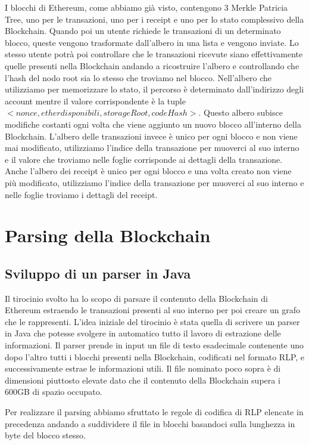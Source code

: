 \documentclass[12pt]{report}
\begin{document}
I blocchi di Ethereum, come abbiamo già visto, contengono 3 Merkle Patricia Tree, uno per le transazioni, uno per i receipt e uno per lo stato complessivo della Blockchain. Quando poi un utente richiede le transazioni di un determinato blocco, queste vengono trasformate dall'albero in una lista e vengono inviate. 
Lo stesso utente potrà poi controllare che le transazioni ricevute siano effettivamente quelle presenti nella Blockchain andando a ricostruire l'albero e controllando che l'hash del nodo root sia lo stesso che troviamo nel blocco.
Nell'albero che utilizziamo per memorizzare lo stato, il percorso è determinato dall'indirizzo degli account mentre il valore corrispondente è la tuple $<nonce, ether disponibili, storageRoot, codeHash>$. Questo albero subisce modifiche costanti ogni volta che viene aggiunto un nuovo blocco all'interno della Blockchain.
L'albero delle transazioni invece è unico per ogni blocco e non viene mai modificato, utilizziamo l'indice della transazione per muoverci al suo interno e il valore che troviamo nelle foglie corrisponde ai dettagli della transazione.
Anche l'albero dei receipt è unico per ogni blocco e una volta creato non viene più modificato, utilizziamo l'indice della transazione per muoverci al suo interno e nelle foglie troviamo i dettagli del receipt.

\newpage
\section{Parsing della Blockchain}

\subsection {Sviluppo di un parser in Java}

Il tirocinio svolto ha lo scopo di parsare il contenuto della Blockchain di Ethereum estraendo le transazioni presenti al suo interno per poi creare un grafo che le rappresenti.
L'idea iniziale del tirocinio è stata quella di scrivere un parser in Java che potesse svolgere in automatico tutto il lavoro di estrazione delle informazioni.
Il parser prende in input un file di testo esadecimale contenente uno dopo l'altro tutti i blocchi presenti nella Blockchain, codificati nel formato RLP, e successivamente estrae le informazioni utili. Il file nominato poco sopra è di dimensioni piuttosto elevate dato che il contenuto della Blockchain supera i 600GB di spazio occupato.

Per realizzare il parsing abbiamo sfruttato le regole di codifica di RLP elencate in precedenza andando a suddividere il file in blocchi basandoci sulla lunghezza in byte del blocco stesso.
\end{document}
